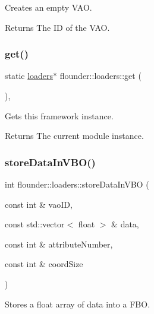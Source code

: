 Creates an empty V\+AO. 

\begin{DoxyReturn}{Returns}
The ID of the V\+AO. 
\end{DoxyReturn}
\mbox{\label{classflounder_1_1loaders_ac57855261d2d43c545cac42e9efe981a}} 
\subsubsection{\texorpdfstring{get()}{get()}}
{\footnotesize\ttfamily static \hyperlink{classflounder_1_1loaders}{loaders}$\ast$ flounder\+::loaders\+::get (\begin{DoxyParamCaption}{ }\end{DoxyParamCaption})\hspace{0.3cm}{\ttfamily [inline]}, {\ttfamily [static]}}



Gets this framework instance. 

\begin{DoxyReturn}{Returns}
The current module instance. 
\end{DoxyReturn}
\mbox{\label{classflounder_1_1loaders_a3fe87c11a6a2e9f3893c847b556d43c2}} 
\subsubsection{\texorpdfstring{store\+Data\+In\+V\+B\+O()}{storeDataInVBO()}}
{\footnotesize\ttfamily int flounder\+::loaders\+::store\+Data\+In\+V\+BO (\begin{DoxyParamCaption}\item[{const int \&}]{vao\+ID,  }\item[{const std\+::vector$<$ float $>$ \&}]{data,  }\item[{const int \&}]{attribute\+Number,  }\item[{const int \&}]{coord\+Size }\end{DoxyParamCaption})}



Stores a float array of data into a F\+BO. 


